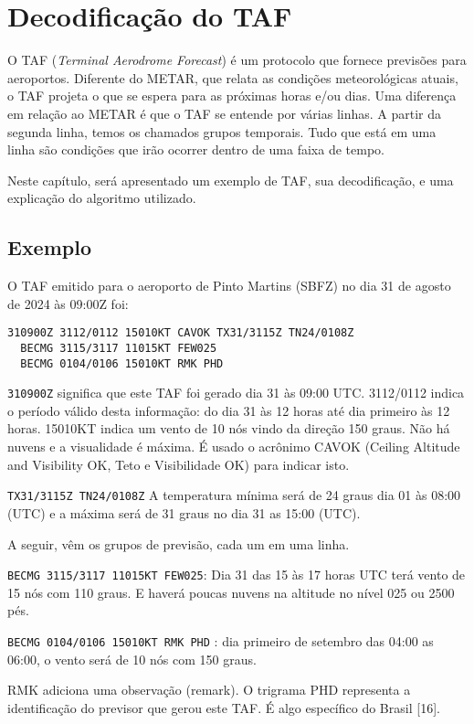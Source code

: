 \chapter{Decodificação do TAF}

O TAF (\textit{Terminal Aerodrome Forecast}) é um protocolo que fornece
previsões para aeroportos. Diferente
do METAR, que relata as condições meteorológicas atuais, o TAF projeta o que se
espera para as próximas horas e/ou dias. Uma diferença em relação ao METAR é que o 
TAF se entende por várias linhas.
A partir da segunda linha, temos os chamados grupos temporais. Tudo que está em uma linha
são condições que irão ocorrer dentro de uma faixa de tempo. 

Neste capítulo, será apresentado um exemplo de TAF, sua decodificação,
e uma explicação do algoritmo utilizado.

\section{Exemplo}
O TAF emitido para o aeroporto de Pinto Martins (SBFZ) no dia 31 de agosto 
de 2024 às 09:00Z foi:

\begin{verbatim}
310900Z 3112/0112 15010KT CAVOK TX31/3115Z TN24/0108Z 
  BECMG 3115/3117 11015KT FEW025 
  BECMG 0104/0106 15010KT RMK PHD
\end{verbatim}

\texttt{310900Z} significa que este TAF foi gerado dia 31 às 09:00 UTC. 3112/0112 indica 
o período válido desta informação: do dia 31 às 
12 horas até dia primeiro às 12 horas. 15010KT indica um vento de 10 nós vindo 
da direção 150 graus. Não há nuvens e a visualidade é máxima. É usado o acrônimo 
CAVOK (Ceiling Altitude and Visibility OK, Teto e Visibilidade OK) para indicar isto.

\texttt{TX31/3115Z TN24/0108Z} A temperatura mínima será de 24 graus dia 01 às 08:00 (UTC) e a máxima será 
de 31 graus no dia 31 as 15:00 (UTC).

A seguir, vêm os grupos de previsão, cada um em uma linha.

\texttt{BECMG 3115/3117 11015KT FEW025}: Dia 31 das 15 às 17 horas UTC terá vento de 
15 nós com 110 graus. E haverá poucas nuvens na altitude no nível 025 ou 2500 pés.

\texttt{BECMG 0104/0106 15010KT RMK PHD} : dia primeiro de setembro das 04:00 as 06:00, 
o vento será de 10 nós com 150 graus.

RMK adiciona uma observação (remark). O trigrama PHD representa a identificação 
do previsor que gerou este TAF. É algo específico do Brasil [16].

